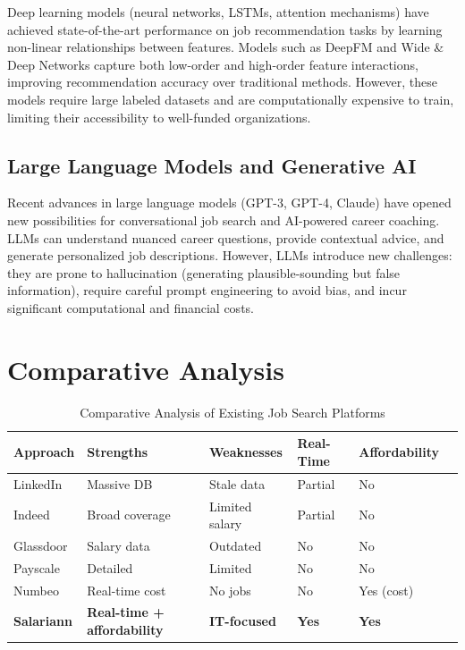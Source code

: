 \documentclass[12pt,a4paper,oneside]{report}
\begin{document}
Deep learning models (neural networks, LSTMs, attention mechanisms) have achieved state-of-the-art performance on job recommendation tasks by learning non-linear relationships between features. Models such as DeepFM and Wide \& Deep Networks capture both low-order and high-order feature interactions, improving recommendation accuracy over traditional methods. However, these models require large labeled datasets and are computationally expensive to train, limiting their accessibility to well-funded organizations.

\subsection{Large Language Models and Generative AI}

Recent advances in large language models (GPT-3, GPT-4, Claude) have opened new possibilities for conversational job search and AI-powered career coaching. LLMs can understand nuanced career questions, provide contextual advice, and generate personalized job descriptions. However, LLMs introduce new challenges: they are prone to hallucination (generating plausible-sounding but false information), require careful prompt engineering to avoid bias, and incur significant computational and financial costs.

\section{Comparative Analysis}

\begin{table}[H]
\centering
\caption{Comparative Analysis of Existing Job Search Platforms}
\label{tab:comparative}
\begin{tabular}{|l|l|l|l|l|l|}
\hline
\textbf{Approach} & \textbf{Strengths} & \textbf{Weaknesses} & \textbf{Real-Time} & \textbf{Affordability} \\
\hline
LinkedIn & Massive DB & Stale data & Partial & No \\
\hline
Indeed & Broad coverage & Limited salary & Partial & No \\
\hline
Glassdoor & Salary data & Outdated & No & No \\
\hline
Payscale & Detailed & Limited & No & No \\
\hline
Numbeo & Real-time cost & No jobs & No & Yes (cost) \\
\hline
\textbf{Salariann} & \textbf{Real-time + affordability} & \textbf{IT-focused} & \textbf{Yes} & \textbf{Yes} \\
\hline
\end{tabular}
\end{table}
\end{document}
